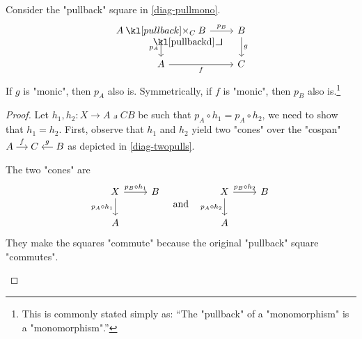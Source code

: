 \documentclass[main.tex]{subfiles}
\begin{document}
\begin{thm}
    Consider the "pullback" square in \eqref{diag-pullmono}.
    \begin{equation}\label{diag-pullmono}
        \begin{tikzcd}
            A \pullback{C} B \arrow[r, "p_B"] \arrow[d, "p_A"'] \arrow[dr, phantom, "\pullbackd", very near start] & B \arrow[d, "g"] \\
            A \arrow[r, "f"'] & C 
        \end{tikzcd}
    \end{equation}
    If $g$ is "monic", then $p_A$ also is. Symmetrically, if $f$ is "monic", then $p_B$ also is.\footnote{This is commonly stated simply as: ``The "pullback" of a "monomorphism" is a "monomorphism".''}
\end{thm}
\begin{proof}
    Let $h_1, h_2: X \rightarrow A \pullback{C} B$ be such that $p_A \circ h_1 = p_A \circ h_2$, we need to show that $h_1 = h_2$. First, observe that $h_1$ and $h_2$ yield two "cones" over the "cospan" $\begin{tikzcd}[cramped, sep=small] A \arrow[r, "f"] & C & B \arrow[l, "g"'] \end{tikzcd}$ as depicted in \eqref{diag-twopulls}.\begin{marginfigure}[2\baselineskip]The two "cones" are \[\begin{tikzcd}
        X & B \\
        A
        \arrow["{p_A \circ h_1}"', from=1-1, to=2-1]
        \arrow["{p_B \circ h_1}", from=1-1, to=1-2]
    \end{tikzcd}\quad \text{and} \quad \begin{tikzcd}
        X & B \\
        A
        \arrow["{p_A \circ h_2}"', from=1-1, to=2-1]
        \arrow["{p_B \circ h_2}", from=1-1, to=1-2]
    \end{tikzcd}\]They make the squares "commute" because the original "pullback" square "commutes".\end{marginfigure}
    \begin{equation}\label{diag-twopulls}

\end{equation}
\end{proof}
\end{document}
